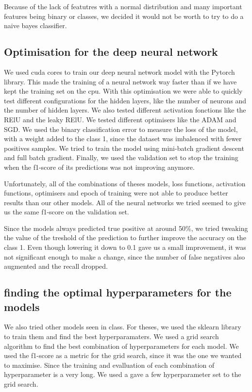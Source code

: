 \documentclass{article} %
\begin{document}
Because of the lack of featutres with a normal distribution and many important features being binary or classes,
we decided it would not be worth to try to do a naive bayes classifier.

\subsection{Optimisation for the deep neural network}
We used cuda cores to train our deep neural network model with the Pytorch library.
This made the training of a neural network way faster than if we have kept the training set on the cpu.
With this optimisation we were able to quickly test different configurations for the hidden layers,
like the number of neurons and the number of hidden layers.
We also tested different activation fonctions like the RElU and the leaky RElU.
We tested different optimisers like the ADAM and SGD.
We used the binary classification error to measure the loss of the model,
with a weight added to the class 1, since the dataset was imbalenced with fewer positives samples.
We tried to train the model using mini-batch gradient descent and full batch gradient.
Finally, we used the validation set to stop the training when the f1-score of its predictions was not improving anymore.


Unfortunately, all of the combinations of theses models, loss functions, activation functions, optimisers and epoch of training were not able to produce
better results than our other models. All of the neural networks we tried seemed to give us the same f1-score on the validation set.

Since the models always predicted true positive at around 50\%, we tried tweaking the value of the treshold
of the prediction to further improve the accuracy on the class 1. Even though lowering it down to 0.1 gave us a small improvement,
it was not significant enough to make a change, since the number of false negatives also augmented and the recall dropped.


\subsection{finding the optimal hyperparameters for the models}
We also tried other models seen in class. For theses, we used the sklearn library to train them and find
the best hyperparamaters. We used a grid search algorithm to find the best combination of hyperparameters
for each model. We used the f1-score as a metric for the grid search, since it was the one we wanted to maximise.
Since the training and evalluation of each combination of hyperparameter is a very long. We used a gave a few hyperparameter
set to the grid search. 
\end{document}
